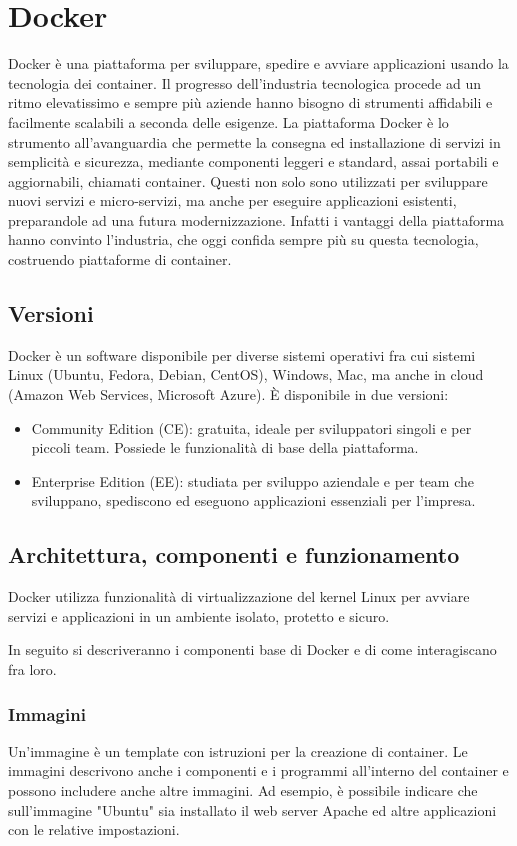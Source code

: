 \chapter{Docker}
\label{Docker}
\thispagestyle{empty}

Docker è una piattaforma per sviluppare, spedire e avviare applicazioni usando la tecnologia dei container. Il progresso dell'industria tecnologica procede ad un ritmo elevatissimo e sempre più aziende hanno bisogno di strumenti affidabili e facilmente scalabili a seconda delle esigenze. La piattaforma Docker è lo strumento all'avanguardia che permette la consegna ed installazione di servizi in semplicità e sicurezza, mediante componenti leggeri e standard, assai portabili e aggiornabili, chiamati container. Questi non solo sono utilizzati per sviluppare nuovi servizi e micro-servizi, ma anche per eseguire applicazioni esistenti, preparandole ad una futura modernizzazione. Infatti i vantaggi della piattaforma hanno convinto l'industria, che oggi confida sempre più su questa tecnologia, costruendo piattaforme di container.

\section{Versioni}
Docker è un software disponibile per diverse sistemi operativi fra cui sistemi Linux (Ubuntu, Fedora, Debian, CentOS), Windows, Mac, ma anche in cloud (Amazon Web Services, Microsoft Azure). È disponibile in due versioni:
\begin{itemize}
    \item Community Edition (CE): gratuita, ideale per sviluppatori singoli e per piccoli team. Possiede le funzionalità di base della piattaforma.
    \item Enterprise Edition (EE): studiata per sviluppo aziendale e per team che sviluppano, spediscono ed eseguono applicazioni essenziali per l'impresa.
\end{itemize}

\section{Architettura, componenti e funzionamento}
Docker utilizza funzionalità di virtualizzazione del kernel Linux per avviare servizi e applicazioni in un ambiente isolato, protetto e sicuro.

In seguito si descriveranno i componenti base di Docker e di come interagiscano fra loro.

\subsection{Immagini}
Un'immagine è un template con istruzioni per la creazione di container. Le immagini descrivono anche i componenti e i programmi all'interno del container e possono includere anche altre immagini. Ad esempio, è possibile indicare che sull'immagine "Ubuntu" sia installato il web server Apache ed altre applicazioni con le relative impostazioni.

